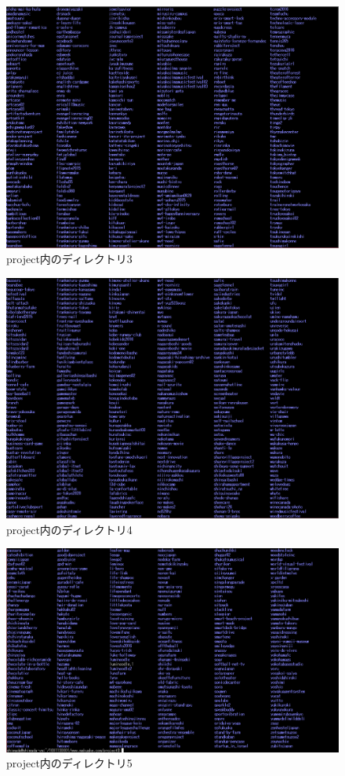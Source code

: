 \begin{figure}[H]
\centering
\includegraphics[width=12cm]{hozon7.PNG}
\caption{project内のディレクトリ3}\label{サンプル図}
\end{figure}
\newpage

\begin{figure}[H]
\centering
\includegraphics[width=12cm]{hozon8.PNG}
\caption{project内のディレクトリ4}\label{サンプル図}
\end{figure}
\newpage

\begin{figure}[H]
\centering
\includegraphics[width=12cm]{hozon9.PNG}
\caption{project内のディレクトリ5}\label{サンプル図}
\end{figure}

